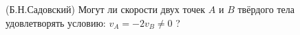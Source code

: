 (Б.Н.Садовский)
Могут ли скорости двух точек $A$ и $B$ твёрдого тела удовлетворять
условию: $v_ A= -2v_B\neq0$ ?
